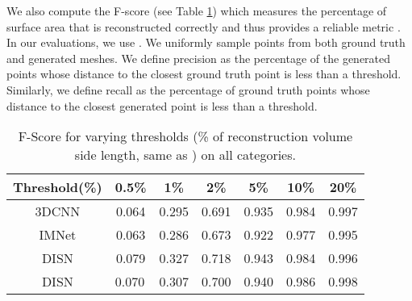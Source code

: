 We also compute the F-score (see Table \ref{tab:fscore}) which measures the percentage of surface area that is reconstructed correctly and thus provides a reliable metric \cite{tatarchenko2019single}. In our evaluations, we use . We uniformly sample points from both ground truth and generated meshes. We define precision as the percentage of the generated points whose distance to the closest ground truth point is less than a threshold. Similarly, we define recall as the percentage of ground truth points whose distance to the closest generated point is less than a threshold.

\begin{table}[]
\begin{minipage}{.6\textwidth}
    \centering
    \setlength{\tabcolsep}{3pt} \setlength{\arrayrulewidth}{1pt}
    \begin{tabular}{c|cccccc}
        \hline
        Threshold(\%) & 0.5\%                     & 1\%                       & 2\%                       & 5\%                       & 10\%                      & 20\%                      \\ \hline
        3DCNN                & 0.064                     & 0.295                     & 0.691                     & 0.935                     & 0.984                     & 0.997                     \\ \hline
        IMNet                & 0.063                     & 0.286                     & 0.673                     & 0.922                     & 0.977                     & 0.995                     \\ \hline
        DISN          & 0.079                     & 0.327                     & 0.718                     & 0.943                     & 0.984                     & 0.996                     \\ \hline
        DISN         & \multicolumn{1}{l}{0.070} & \multicolumn{1}{l}{0.307} & \multicolumn{1}{l}{0.700} & \multicolumn{1}{l}{0.940} & \multicolumn{1}{l}{0.986} & \multicolumn{1}{l}{0.998} \\ \hline
        \bottomrule
    \end{tabular}
    \vspace{3pt}
    \caption {F-Score for varying thresholds (\% of reconstruction volume side length, same as \cite{tatarchenko2019single}) on all categories.}
    \label{tab:fscore}
\end{minipage}
\vspace{-10pt}
\hspace*{0.1cm}
\begin{minipage}{.4\textwidth}

\end{minipage}
\end{table}
